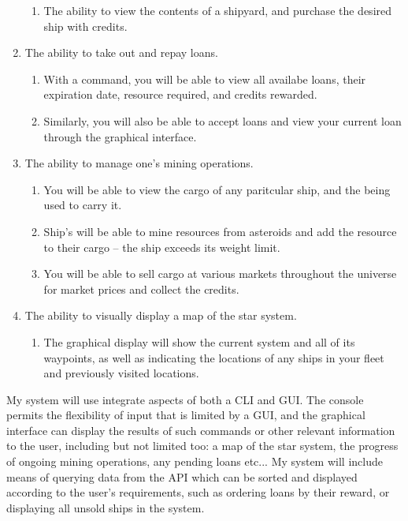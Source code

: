 \begin{enumerate}
\begin{enumerate}
            \item The ability to view the contents of a shipyard, and purchase the desired ship with credits. 
        \end{enumerate}
    \item The ability to take out and repay loans.
        \begin{enumerate}
            \item With a command, you will be able to view all availabe loans, their expiration date, resource required, and credits rewarded.
            \item Similarly, you will also be able to accept loans and view your current loan through the graphical interface.
        \end{enumerate}
    \item The ability to manage one's mining operations.
        \begin{enumerate}
            \item You will be able to view the cargo of any paritcular ship, and the being used to carry it. 
            \item Ship's will be able to mine resources from asteroids and add the resource to their cargo – the ship exceeds its weight limit.
            \item You will be able to sell cargo at various markets throughout the universe for market prices and collect the credits.
        \end{enumerate}
    \item The ability to visually display a map of the star system.
        \begin{enumerate}
            \item The graphical display will show the current system and all of its waypoints, as well as indicating the locations of any ships in your fleet and previously visited locations.
        \end{enumerate}
\end{enumerate}

My system will use integrate aspects of both a CLI and GUI. The console permits the flexibility of input that is limited by a GUI, and the graphical interface can display the results of such commands or other relevant information to the user, including but not limited too: a map of the star system, the progress of ongoing mining operations, any pending loans etc... My system will include means of querying data from the API which can be sorted and displayed according to the user's requirements, such as ordering loans by their reward, or displaying all unsold ships in the system. 

